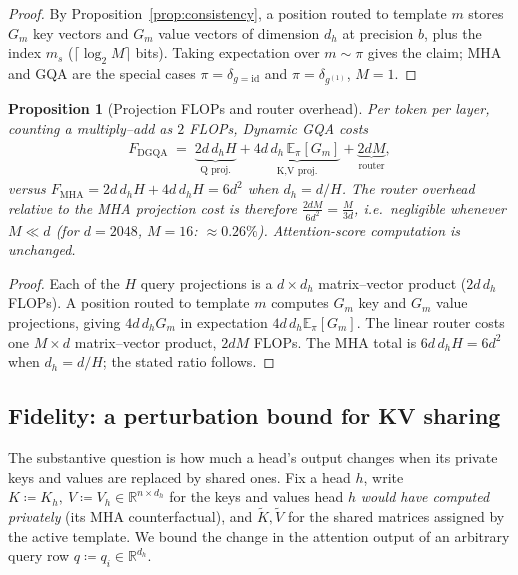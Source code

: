 \documentclass{article}
\newtheorem{proposition}[theorem]{Proposition}
\newcommand{\R}{\mathbb{R}}
\newcommand{\E}{\mathbb{E}}
\begin{document}
\begin{proof}
By Proposition~\ref{prop:consistency}, a position routed to template $m$
stores $G_m$ key vectors and $G_m$ value vectors of dimension $d_h$ at
precision $b$, plus the index $m_s$ ($\lceil \log_2 M \rceil$ bits). Taking
expectation over $m \sim \pi$ gives the claim; MHA and GQA are the special
cases $\pi = \delta_{g=\mathrm{id}}$ and $\pi = \delta_{g^{(1)}}$,
$M = 1$.
\end{proof}

\begin{proposition}[Projection FLOPs and router overhead]
\label{prop:flops}
Per token per layer, counting a multiply--add as $2$ FLOPs, Dynamic GQA
costs
\begin{align}
F_{\mathrm{DGQA}} \;=\;
\underbrace{2 d\, d_h H}_{\text{Q proj.}}
+ \underbrace{4 d\, d_h\, \E_\pi[G_m]}_{\text{K,V proj.}}
+ \underbrace{2 d M}_{\text{router}},
\end{align}
versus $F_{\mathrm{MHA}} = 2 d\, d_h H + 4 d\, d_h H = 6 d^2$ when
$d_h = d/H$. The router overhead relative to the MHA projection cost is
therefore $\frac{2 d M}{6 d^2} = \frac{M}{3d}$, i.e.\ negligible whenever
$M \ll d$ (for $d = 2048$, $M = 16$: $\approx 0.26\%$).
Attention-score computation is unchanged.
\end{proposition}

\begin{proof}
Each of the $H$ query projections is a $d \times d_h$ matrix--vector product
($2 d\, d_h$ FLOPs). A position routed to template $m$ computes $G_m$ key
and $G_m$ value projections, giving $4 d\, d_h G_m$ in expectation
$4 d\, d_h \E_\pi[G_m]$. The linear router costs one $M \times d$
matrix--vector product, $2dM$ FLOPs. The MHA total is
$6 d\, d_h H = 6 d^2$ when $d_h = d/H$; the stated ratio follows.
\end{proof}

\subsection{Fidelity: a perturbation bound for KV sharing}
\label{sec:fidelity}

The substantive question is how much a head's output changes when its
private keys and values are replaced by shared ones. Fix a head $h$, write
$K \coloneqq K_h,\ V \coloneqq V_h \in \R^{n \times d_h}$ for the keys and
values head $h$ \emph{would have computed privately} (its MHA
counterfactual), and $\tilde K, \tilde V$ for the shared matrices assigned
by the active template. We bound the change in the attention output of an
arbitrary query row $q \coloneqq q_i \in \R^{d_h}$.
\end{document}
